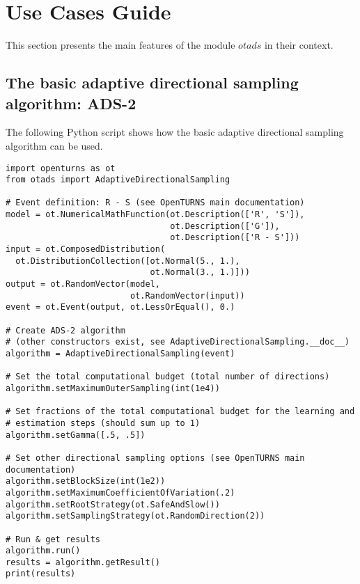 % 




\section{Use Cases Guide}

This section presents the main features of the module $otads$ in their context.\par

\subsection{The basic adaptive directional sampling algorithm: ADS-2}

The following Python script shows how the basic adaptive directional sampling algorithm can be used.\par

\begin{lstlisting}
import openturns as ot
from otads import AdaptiveDirectionalSampling

# Event definition: R - S (see OpenTURNS main documentation)
model = ot.NumericalMathFunction(ot.Description(['R', 'S']),
                                 ot.Description(['G']),
                                 ot.Description(['R - S']))
input = ot.ComposedDistribution(
  ot.DistributionCollection([ot.Normal(5., 1.),
                             ot.Normal(3., 1.)]))
output = ot.RandomVector(model,
                         ot.RandomVector(input))
event = ot.Event(output, ot.LessOrEqual(), 0.)
                                 
# Create ADS-2 algorithm
# (other constructors exist, see AdaptiveDirectionalSampling.__doc__)
algorithm = AdaptiveDirectionalSampling(event)

# Set the total computational budget (total number of directions)
algorithm.setMaximumOuterSampling(int(1e4))

# Set fractions of the total computational budget for the learning and
# estimation steps (should sum up to 1)
algorithm.setGamma([.5, .5])

# Set other directional sampling options (see OpenTURNS main documentation)
algorithm.setBlockSize(int(1e2))
algorithm.setMaximumCoefficientOfVariation(.2)
algorithm.setRootStrategy(ot.SafeAndSlow())
algorithm.setSamplingStrategy(ot.RandomDirection(2))

# Run & get results
algorithm.run()
results = algorithm.getResult()
print(results)
\end{lstlisting}

